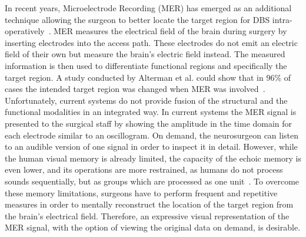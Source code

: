 \documentclass[review]{vgtc}                 %
\begin{document}
In recent years, Microelectrode Recording (MER) has emerged as an additional technique allowing the surgeon to better locate the target region for DBS intra-operatively~\cite{Lenz1988}. MER measures the electrical field of the brain during surgery by inserting electrodes into the access path. These electrodes do not emit an electric field of their own but measure the brain's electric field instead. The measured information is then used to differentiate functional regions and specifically the target region. A study conducted by Alterman et al. could show that in 96\% of cases the intended target region was changed when MER was involved~\cite{Alterman1999}. Unfortunately, current systems do not provide fusion of the structural and the functional modalities in an integrated way. In current systems the MER signal is presented to the surgical staff by showing the amplitude in the time domain for each electrode similar to an oscillogram. On demand, the neurosurgeon can listen to an audible version of one signal in order to inspect it in detail. However, while the human visual memory is already limited, the capacity of the echoic memory is even lower, and its operations are more restrained, as humans do not process sounds sequentially, but as groups which are processed as one unit~\cite{Radvansky2005}. To overcome these memory limitations, surgeons have to perform frequent and repetitive measures in order to mentally reconstruct the location of the target region from the brain's electrical field. Therefore, an expressive visual representation of the MER signal, with the option of viewing the original data on demand, is desirable.
\end{document}
